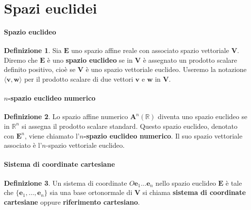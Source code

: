 \documentclass{article}
\theoremstyle{plain}
\theoremstyle{definition}
\newtheorem{defn}{Definizione}[section]
\theoremstyle{remark}
\begin{document}
\newpage
\section{Spazi euclidei}
\vspace{20pt}

\paragraph{Spazio euclideo}
\begin{bxthm}
\begin{defn}
Sia $\mathbf{E}$ uno spazio affine reale con associato spazio vettoriale $\mathbf{V}$. 
Diremo che $\mathbf{E}$ è uno \textbf{spazio euclideo} se in $\mathbf{V}$ è assegnato un prodotto scalare 
definito positivo, cioè se $\mathbf{V}$ è uno spazio vettoriale euclideo. Useremo la notazione 
$\langle \mathbf{v}, \mathbf{w} \rangle$ per il prodotto scalare di due vettori $\mathbf{v}$ e $\mathbf{w}$ 
in $\mathbf{V}$.    
\end{defn}
\end{bxthm}

\vspace{10pt}

\paragraph{$n$-spazio euclideo numerico}
\begin{bxthm}
\begin{defn}
Lo spazio affine numerico $\mathbf{A}^n(\mathbb{R})$ diventa uno spazio euclideo se in $\mathbb{R}^n$ si 
assegna il prodotto scalare standard. Questo spazio euclideo, denotato con $\mathbf{E}^n$, viene chiamato 
l'\textbf{$n$-spazio euclideo numerico}. Il suo spazio vettoriale associato è l'$n$-spazio vettoriale euclideo.
\end{defn}
\end{bxthm}

\vspace{10pt}

\paragraph{Sistema di coordinate cartesiane}
\begin{bxthm}
\begin{defn}
Un sistema di coordinate $O\mathbf{e}_1 \ldots \mathbf{e}_n$ nello spazio euclideo $\mathbf{E}$ è tale che 
$\{\mathbf{e}_1, \ldots, \mathbf{e}_n\}$ sia una base ortonormale di $\mathbf{V}$ si chiama 
\textbf{sistema di coordinate cartesiane} oppure \textbf{riferimento cartesiano}.     
\end{defn}
\end{bxthm}
\end{document}
